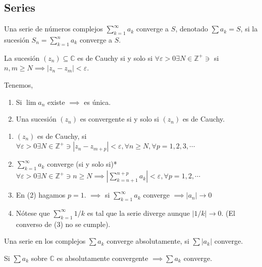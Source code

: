 \subsection{Series}

\begin{definicion}
    Una serie de números complejos $\sum_{k=1}^{\infty}a_k$ converge a $S$, denotado $\sum a_k=S$, si la sucesión $S_n=\sum_{k=1}^n a_k$ converge a $S$. 
\end{definicion}

\begin{definicion}
    La sucesión $(z_n)\subseteq \mathbb{C}$ es de Cauchy si y solo si $\forall \varepsilon>0\exists N\in\mathbb{Z}^+\ni$ si $n,m\geq N\implies |z_n-z_m|<\varepsilon$. 
\end{definicion}

\begin{teorema}
    Tenemos, 
    \begin{enumerate}
        \item Si $\lim a_n$ existe $\implies $ es única. 
        \item Una sucesión $(z_n)$ es convergente si y solo si $(z_n)$ es de Cauchy. 
    \end{enumerate}
\end{teorema}


\begin{nota}
    \begin{enumerate}
        \item $(z_n)$ es de Cauchy, si $\forall \varepsilon >0\exists N\in\mathbb{Z}^+\ni |z_n-z_{m+p}|<\varepsilon,\forall n\geq N,\forall p=1,2,3,\cdots
        $
        \item $\sum_{k=1}^\infty a_k$ converge (si y solo si)* $\forall \varepsilon>0\exists N\in \mathbb{Z}^+\ni n\geq N\implies |\sum_{k=n+1}^{n+p}a_k|<\varepsilon, \forall p=1,2,\cdots$
        \item En (2) hagamos $p=1$. $\implies$ si $\sum_{k=1}^{\infty}a_k$ converge $\implies |a_n|\to 0$
        \item Nótese que $\sum_{k=1}^\infty 1/k$ es tal que la serie diverge aunque $|1/k|\to 0$. (El converso de (3) no se cumple).
    \end{enumerate}
    
\end{nota}

\begin{definicion}
    Una serie en los complejos $\sum a_k$ converge absolutamente, si $\sum |a_k|$ converge. 
\end{definicion}

\begin{teorema}
    Si $\sum a_k$ sobre $\mathbb{C}$ es absolutamente convergente $\implies \sum a_k$ converge. 
     
\end{teorema}